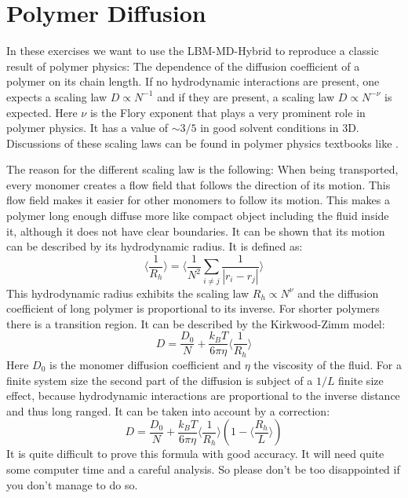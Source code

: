 
\chapter{Polymer Diffusion}
In these exercises we want to use the LBM-MD-Hybrid to reproduce a classic
result of polymer physics: The dependence of the diffusion coefficient
of a polymer on its chain length. If no hydrodynamic interactions
are present, one expects a scaling law $D \propto N^{-1}$ and if 
they are present, a scaling law $D \propto N^{-\nu}$ is expected. 
Here $\nu$ is the Flory exponent that plays a very prominent role
in polymer physics. It has a value of $\sim 3/5$ in good solvent
conditions in 3D. Discussions of these scaling laws can be found
in polymer physics textbooks like \cite{degennes79a, doi96a, rubinstein03a}.


The reason for the different scaling law is the following:
When being transported, every monomer creates a flow field that follows
the direction of its motion. This flow field makes it easier 
for other monomers to follow its motion. This makes a polymer
long enough diffuse more like compact object including the fluid
inside it, although it does not have clear boundaries. It can be shown 
that its motion can be described by its hydrodynamic radius. It is defined 
as:
\begin{equation}
  \langle \frac{1}{R_h} \rangle = \langle \frac{1}{N^2}\sum_{i\neq j} \frac{1}{\left| r_i - r_j \right|} \rangle
\end{equation}
This hydrodynamic radius exhibits the scaling law  $R_h \propto N^{\nu}$
and the diffusion coefficient of long polymer is proportional to its inverse.
For shorter polymers there is a transition region. It can be described
by the Kirkwood-Zimm model:
\begin{equation}
  D=\frac{D_0}{N} + \frac{k_B T}{6 \pi \eta } \langle \frac{1}{R_h} \rangle
\end{equation}
Here $D_0$ is the monomer diffusion coefficient and $\eta$ the 
viscosity of the fluid. For a finite system size the second part of the
diffusion is subject of a $1/L$ finite size effect, because
hydrodynamic interactions are proportional to the inverse
distance and thus long ranged. It can be taken into account
by a correction:
\begin{equation}
  D=\frac{D_0}{N} + \frac{k_B T}{6 \pi \eta } \langle \frac{1}{R_h} \rangle \left( 1- \langle\frac{R_h}{L} \rangle \right)
  \label{kirkwood}
\end{equation}
It is quite difficult to prove this formula with good accuracy. It will 
need quite some computer time and a careful analysis. So please don't be
too disappointed if you don't manage to do so.


